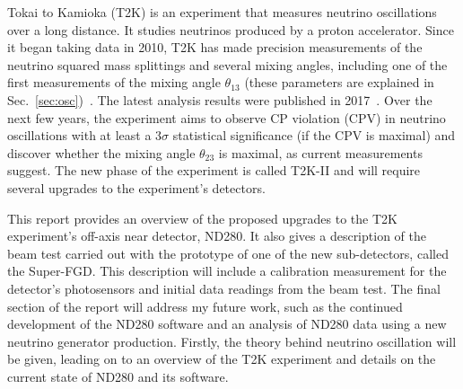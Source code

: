 \documentclass[aps,pra,12pt,notitlepage,tightenlines]{revtex4-1}
\begin{document}
Tokai to Kamioka (T2K) is an experiment that measures neutrino oscillations over a long distance. It studies neutrinos produced by a proton accelerator. Since it began taking data in 2010, T2K has made precision measurements of the neutrino squared mass splittings and several mixing angles, including one of the first measurements of the mixing angle $\theta_{13}$ (these parameters are explained in Sec.\ \ref{sec:osc})~\cite{PhysRevD.88.032002}. The latest analysis results were published in 2017~\cite{Abe:2017bay}. Over the next few years, the experiment aims to observe CP violation (CPV) in neutrino oscillations with at least a 3$\sigma$ statistical significance (if the CPV is maximal) and discover whether the mixing angle $\theta_{23}$ is maximal, as current measurements suggest. The new phase of the experiment is called T2K-II and will require several upgrades to the experiment's detectors.

This report provides an overview of the proposed upgrades to the T2K experiment's off-axis near detector, ND280. It also gives a description of the beam test carried out with the prototype of one of the new sub-detectors, called the Super-FGD. This description will include a calibration measurement for the detector's photosensors and initial data readings from the beam test. The final section of the report will address my future work, such as the continued development of the ND280 software and an analysis of ND280 data using a new neutrino generator production. Firstly, the theory behind neutrino oscillation will be given, leading on to an overview of the T2K experiment and details on the current state of ND280 and its software.
\end{document}
